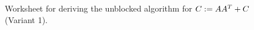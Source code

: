 \documentclass{article}
\begin{document}
\begin{figure}[tbp]

\begin{center}     %
\footnotesize      %
 
\worksheet         %
\end{center} 
 
 
\caption{ Worksheet for deriving the unblocked algorithm for 
$C := A A^T + C$ (Variant 1).} 
 
 
 
\label{FLA_Syrk_ln:ws_unb_var1} 
 
\end{figure} 




\renewcommand{\partitionings}{
  $
  A \rightarrow
  \FlaTwoByOne{A_{T}}
              {A_{B}}
  $
,
  $
  C \rightarrow
  \FlaTwoByTwo{C_{TL}}{C_{TR}}
              {C_{BL}}{C_{BR}}
  $
}

\renewcommand{\partitionsizes}{
$ A_{T} $ has $ 0 $ rows,
$ C_{TL} $ is $ 0 \times 0 $
}


\renewcommand{\repartitionings}{
$
  \FlaTwoByOne{ A_T }
              { A_B }
\rightarrow
  \FlaThreeByOneB{A_0}
                 {a_1^T}
                 {A_2}
$
,
$
  \FlaTwoByTwo{C_{TL}}{C_{TR}}
              {C_{BL}}{C_{BR}}
  \rightarrow
  \FlaThreeByThreeBR{C_{00}}{c_{01}}{C_{02}}
                    {c_{10}^T}{\gamma_{11}}{c_{12}^T}
                    {C_{20}}{c_{21}}{C_{22}}
$}

\renewcommand{\repartitionsizes}{
$ a_1 $ has $ 1 $ row,
  $ \gamma_{11} $ is $ 1 \times 1 $
}


\renewcommand{\moveboundaries}{
$
  \FlaTwoByOne{ A_T }
              { A_B }
\leftarrow
  \FlaThreeByOneT{A_0}
                 {a_1^T}
                 {A_2}
$
,
$
  \FlaTwoByTwo{C_{TL}}{C_{TR}}
              {C_{BL}}{C_{BR}}
  \leftarrow
  \FlaThreeByThreeTL{C_{00}}{c_{01}}{C_{02}}
                    {c_{10}^T}{\gamma_{11}}{c_{12}^T}
                    {C_{20}}{c_{21}}{C_{22}}
$}
\end{document}

